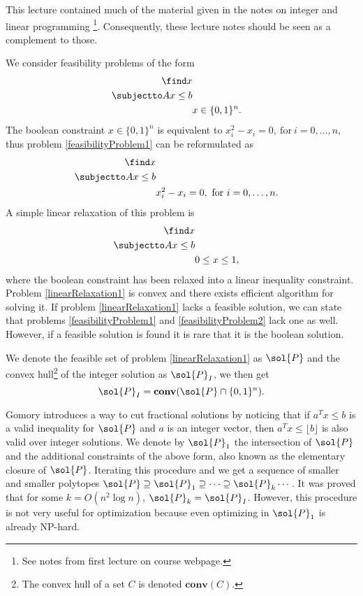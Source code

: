 \documentclass[a4paper,twoside,justified]{tufte-handout}
\begin{document}
 

This lecture contained much of the material given in the notes on integer and linear programming \footnote{See notes from first lecture on course webpage.}. Consequently, these lecture notes should be seen as a complement to those.

We consider feasibility problems of the form 
\begin{alignat}{2}
\label{feasibilityProblem1}
  \find x\notag \\
  \subjectto Ax \leq b \\
  & x \in \{0,1\}^n.\notag
\end{alignat}
The boolean constraint $x \in \{0,1\}^n$ is equivalent to $x_i^2-x_i=0,\ \text{for}\ i=0,\ldots,n$, thus problem \eqref{feasibilityProblem1} can be reformulated as
\begin{alignat}{2}
\label{feasibilityProblem2}
  \find x\notag \\
  \subjectto Ax \leq b \\
  & x_i^2-x_i=0,\ \text{for}\ i=0,\ldots,n.\notag
\end{alignat}
A simple linear relaxation of this problem is
\begin{alignat}{2}
\label{linearRelaxation1}
  \find x\notag \\
  \subjectto Ax \leq b \\
  & 0\leq x\leq 1,\notag
\end{alignat}
where the boolean constraint has been relaxed into a linear inequality constraint. Problem \eqref{linearRelaxation1} is convex and there exists efficient algorithm for solving it. If problem \eqref{linearRelaxation1} lacks a feasible solution, we can state that problems \eqref{feasibilityProblem1} and \eqref{feasibilityProblem2} lack one as well. However, if a feasible solution is found it is rare that it is the boolean solution.

We denote the feasible set of problem \eqref{linearRelaxation1} as $\sol{P}$ and the convex hull\footnote{The convex hull of a set $C$ is denoted $\mathbf{conv}(C)$.} of the integer solution as $\sol{P}_{I}$, we then get
\begin{equation}
\sol{P}_{I} = \mathbf{conv}(\sol{P}\cap\{0,1\}^n).
\end{equation}

Gomory\cite{gomory1958outline} introduces a way to cut fractional solutions by noticing that if $a^Tx \le b$ is a valid inequality
for $\sol{P}$ and $a$ is an integer vector, then $a^Tx \le \lfloor b \rfloor$ is also valid over integer solutions.
We denote by $\sol{P}_1$ the intersection of $\sol{P}$ and the additional constraints of the above form,
also known as the elementary closure of $\sol{P}$. Iterating this procedure and we get a sequence of smaller and smaller
polytopes $\sol{P} \supseteq \sol{P}_1 \supseteq \cdots \supseteq \sol{P}_k \cdots$.
It was proved that for some $k=O(n^2 \log n)$, $\sol{P}_k=\sol{P}_{I}$.
However, this procedure is not very useful for optimization because even optimizing in $\sol{P}_1$ is already NP-hard.
\end{document}
